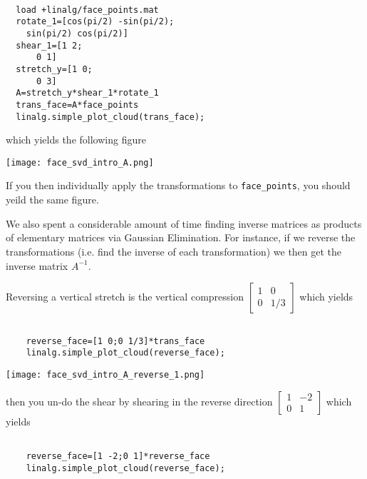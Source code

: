 \documentclass{ximera}
\begin{document}
\begin{verbatim}

  load +linalg/face_points.mat
  rotate_1=[cos(pi/2) -sin(pi/2);
    sin(pi/2) cos(pi/2)]
  shear_1=[1 2;
      0 1]
  stretch_y=[1 0;
      0 3]
  A=stretch_y*shear_1*rotate_1
  trans_face=A*face_points
  linalg.simple_plot_cloud(trans_face);

\end{verbatim}

which yields the following figure 

\begin{center}
  \texttt{[image: face\_svd\_intro\_A.png]}
\end{center}

If you then individually apply the transformations to \texttt{face\_points}, you should yeild the same figure. 

We also spent a considerable amount of time finding inverse matrices as products of elementary matrices via Gaussian Elimination. For instance, if we reverse the transformations (i.e. find the inverse of each transformation) we then get the inverse matrix $A^{-1}$.

Reversing a vertical stretch is the vertical compression $\begin{bmatrix}1 &0\\
  0 &1/3\end{bmatrix}$ which yields

  \begin{verbatim}

    reverse_face=[1 0;0 1/3]*trans_face
    linalg.simple_plot_cloud(reverse_face);

  \end{verbatim}

\begin{center}
  \texttt{[image: face\_svd\_intro\_A\_reverse\_1.png]}
\end{center}

then you un-do the shear by shearing in the reverse direction $\begin{bmatrix}1 &-2\\
  0 &1\end{bmatrix}$ which yields 

  \begin{verbatim}

    reverse_face=[1 -2;0 1]*reverse_face
    linalg.simple_plot_cloud(reverse_face);

  \end{verbatim}
\end{document}
